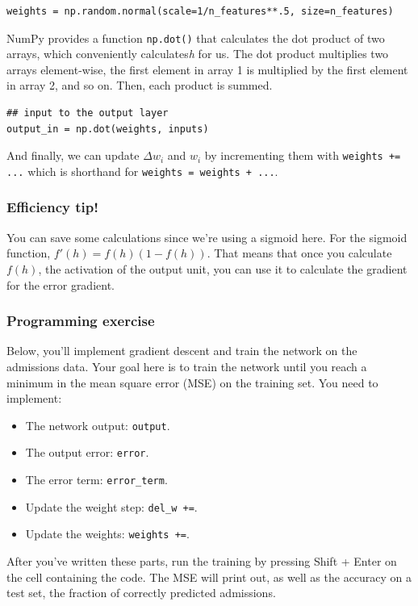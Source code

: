 \begin{lstlisting}
weights = np.random.normal(scale=1/n_features**.5, size=n_features)
\end{lstlisting}

NumPy provides a function \lstinline|np.dot()| that calculates the dot product of two arrays, which conveniently calculates\textit{h} for us. The dot product multiplies two arrays element-wise, the first element in array 1 is multiplied by the first element in array 2, and so on. Then, each product is summed.

\begin{lstlisting}
## input to the output layer
output_in = np.dot(weights, inputs)
\end{lstlisting}

And finally, we can update \(\Delta w_i\) and \(w_i\) by incrementing them with \lstinline|weights += ...| which is shorthand for \lstinline|weights = weights + ...|.


\subsubsection{Efficiency tip!}

You can save some calculations since we're using a sigmoid here. For the sigmoid function, \(f'(h)=f(h)(1-f(h))\). That means that once you calculate \(f(h)\), the activation of the output unit, you can use it to calculate the gradient for the error gradient.

\subsubsection{Programming exercise}

Below, you'll implement gradient descent and train the network on the admissions data. Your goal here is to train the network until you reach a minimum in the mean square error (MSE) on the training set. You need to implement:

\begin{itemize}
    \item The network output: \lstinline|output|.
    \item The output error: \lstinline|error|.
    \item The error term: \lstinline{error_term}.
    \item Update the weight step: \lstinline{del_w +=}.
    \item Update the weights: \lstinline|weights +=|.
\end{itemize}
After you've written these parts, run the training by pressing Shift + Enter on the cell containing the code. The MSE will print out, as well as the accuracy on a test set, the fraction of correctly predicted admissions.

